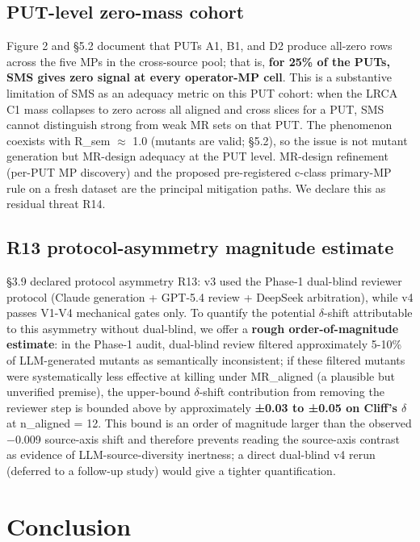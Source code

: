 \documentclass[acmsmall,screen,review]{acmart}
\begin{document}
\subsection{PUT-level zero-mass cohort}\label{put-level-zero-mass-cohort}

Figure 2 and §5.2 document that PUTs A1, B1, and D2 produce all-zero
rows across the five MPs in the cross-source pool; that is,
\textbf{for 25\% of the PUTs, SMS gives zero signal at every operator-MP
cell}. This is a substantive limitation of SMS as an adequacy metric on
this PUT cohort: when the LRCA C1 mass collapses to zero across all
aligned and cross slices for a PUT, SMS cannot distinguish strong from
weak MR sets on that PUT. The phenomenon coexists with R\_sem $\approx$ 1.0
(mutants are valid; §5.2), so the issue is not mutant generation but
MR-design adequacy at the PUT level. MR-design refinement (per-PUT
MP discovery) and the proposed pre-registered c-class primary-MP rule
on a fresh dataset are the principal mitigation paths. We declare this
as residual threat R14.

\subsection{R13 protocol-asymmetry magnitude estimate}\label{r13-protocol-asymmetry-magnitude-estimate}

§3.9 declared protocol asymmetry R13: v3 used the Phase-1 dual-blind
reviewer protocol (Claude generation + GPT-5.4 review + DeepSeek
arbitration), while v4 passes V1-V4 mechanical gates only. To quantify
the potential $\delta$-shift attributable to this asymmetry without dual-blind,
we offer a \textbf{rough order-of-magnitude estimate}: in the Phase-1
audit, dual-blind review filtered approximately 5-10\% of LLM-generated
mutants as semantically inconsistent; if these filtered mutants were
systematically less effective at killing under MR\_aligned (a plausible
but unverified premise), the upper-bound $\delta$-shift contribution from
removing the reviewer step is bounded above by approximately
\textbf{±0.03 to ±0.05 on Cliff's $\delta$} at n\_aligned = 12. This bound is
an order of magnitude larger than the observed −0.009 source-axis shift
and therefore prevents reading the source-axis contrast as evidence of
LLM-source-diversity inertness; a direct dual-blind v4 rerun (deferred
to a follow-up study) would give a tighter quantification.


\section{Conclusion}\label{conclusion}
\end{document}
